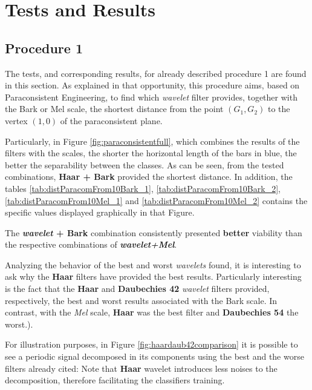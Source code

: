 \section{Tests and Results}
\label{sec:testsResults}
	\subsection{Procedure 1}
		\label{sec:testsResults:subsec:Experimento01}
		\par The tests, and corresponding results, for already described procedure 1   are found in this section. As explained in that opportunity, this procedure aims, based on Paraconsistent Engineering, to find which \textit{wavelet} filter provides, together with the Bark or Mel scale, the shortest distance from the point $(G_1,G_2)$ to the vertex $(1,0)$ of the paraconsistent plane.\\
		
		\par Particularly, in Figure \ref{fig:paraconsistentfull}, which combines the results of the filters with the scales, the shorter the horizontal length of the bars in blue, the better the separability between the classes. As can be seen, from the tested combinations, \textbf{Haar + Bark} provided the shortest distance. In addition, the tables \ref{tab:distParacomFrom10Bark_1}, \ref{tab:distParacomFrom10Bark_2}, \ref{tab:distParacomFrom10Mel_1} and \ref{tab:distParacomFrom10Mel_2} contains the specific values displayed graphically in that Figure.\\
		
		\par The \textbf{\textit{wavelet} + Bark} combination consistently presented \textbf{better} viability than the respective combinations of \textbf{\textit{wavelet+Mel}}.\\
		
		\par Analyzing the behavior of the best and worst \textit{wavelets} found, it is interesting to ask why the \textbf{Haar} filters have provided the best results. Particularly interesting is the fact that the \textbf{Haar} and \textbf{Daubechies 42} \textit{wavelet} filters provided, respectively, the best and worst results associated with the Bark scale. In contrast, with the \textit{Mel} scale, \textbf{Haar} was the best filter and \textbf{Daubechies 54} the worst.).\\
		
		\par For illustration purposes, in Figure \ref{fig:haardaub42comparison} it is possible to see a periodic signal decomposed in its components using the best and the worse filters already cited: Note that \textbf{Haar} wavelet introduces less noises to the decomposition, therefore facilitating the classifiers training.
		
